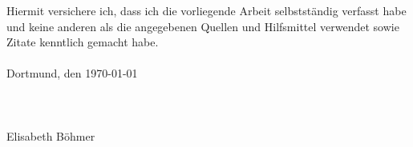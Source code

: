 \cleardoublepage
\normalsize
Hiermit versichere ich, dass ich die vorliegende Arbeit selbstständig verfasst habe und keine anderen als die angegebenen Quellen und Hilfsmittel verwendet sowie Zitate kenntlich gemacht habe.\\\\
Dortmund, den \today \\\\\\\\
Elisabeth Böhmer